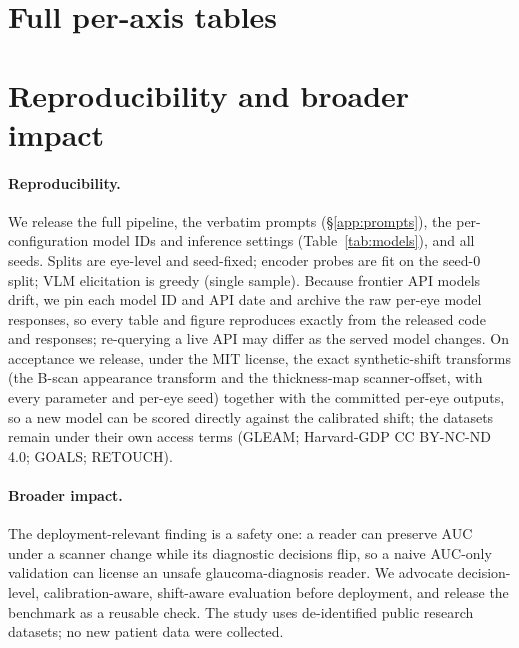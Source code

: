 

\section{Full per-axis tables}
\label{app:fulltables}


\section{Reproducibility and broader impact}
\label{app:repro}

\paragraph{Reproducibility.} We release the full pipeline, the verbatim prompts (\S\ref{app:prompts}), the per-configuration
model IDs and inference settings (Table~\ref{tab:models}), and all seeds. Splits are eye-level and seed-fixed;
encoder probes are fit on the seed-0 split; VLM elicitation is greedy (single sample). Because
frontier API models drift, we pin each model ID and API date and archive the raw per-eye model responses, so every
table and figure reproduces exactly from the released code and responses; re-querying a live API may differ as the
served model changes. On acceptance we release, under the MIT license, the exact synthetic-shift transforms (the
B-scan appearance transform and the thickness-map scanner-offset, with every parameter and per-eye seed) together
with the committed per-eye outputs, so a new model can be scored directly against the calibrated shift; the
datasets remain under their own access terms (GLEAM; Harvard-GDP CC BY-NC-ND 4.0; GOALS; RETOUCH).

\paragraph{Broader impact.} The deployment-relevant finding is a safety one: a reader can preserve AUC under
a scanner change while its diagnostic decisions flip, so a naive AUC-only validation can
license an unsafe glaucoma-diagnosis reader. We advocate decision-level, calibration-aware, shift-aware evaluation
before deployment, and release the benchmark as a reusable check. The study uses de-identified public research
datasets; no new patient data were collected.
